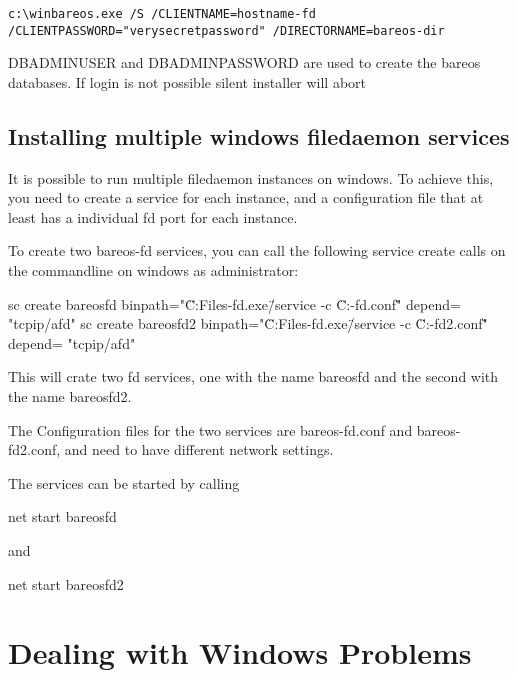 \footnotesize
\begin{verbatim}
c:\winbareos.exe /S /CLIENTNAME=hostname-fd /CLIENTPASSWORD="verysecretpassword" /DIRECTORNAME=bareos-dir
\end{verbatim}
\normalsize

DBADMINUSER and DBADMINPASSWORD are used to create the bareos
databases. If login is not possible silent installer will abort


\subsection{Installing multiple windows filedaemon services}

It is possible to run multiple filedaemon instances on windows.
To achieve this, you  need to create a service for each instance, and a configuration file that at least
has a individual fd port for each instance.

To create two bareos-fd services, you can call the following service create calls on the commandline on windows as administrator:

\begin{commands}{}
sc create bareosfd binpath="\"C:\Program Files\Bareos\bareos-fd.exe\" /service  -c \"C:\ProgramData\Bareos\bareos-fd.conf\""  depend= "tcpip/afd"
sc create bareosfd2 binpath="\"C:\Program Files\Bareos\bareos-fd.exe\" /service  -c \"C:\ProgramData\Bareos\bareos-fd2.conf\""  depend= "tcpip/afd"
\end{commands}

This will crate two fd services, one with the name bareosfd and the second with the name bareosfd2.

The Configuration files for the two services are bareos-fd.conf and bareos-fd2.conf, and need to have different network settings.

The services can be started by calling

\begin{commands}{}
net start bareosfd
\end{commands}

and

\begin{commands}{}
net start bareosfd2
\end{commands}


\section{Dealing with Windows Problems}
\label{problems}

